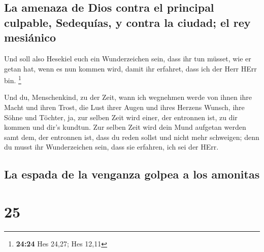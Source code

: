 \hypertarget{la-amenaza-de-dios-contra-el-principal-culpable-sedequuxedas-y-contra-la-ciudad-el-rey-mesiuxe1nico}{%
\subsection{La amenaza de Dios contra el principal culpable, Sedequías,
y contra la ciudad; el rey
mesiánico}\label{la-amenaza-de-dios-contra-el-principal-culpable-sedequuxedas-y-contra-la-ciudad-el-rey-mesiuxe1nico}}

 Und soll also Hesekiel euch ein Wunderzeichen sein, dass
ihr tun müsset, wie er getan hat, wenn es nun kommen wird, damit ihr
erfahret, dass ich der Herr HErr bin. \footnote{\textbf{24:24} Hes
  24,27; Hes 12,11}

 Und du, Menschenkind, zu der Zeit, wann ich wegnehmen
werde von ihnen ihre Macht und ihren Trost, die Lust ihrer Augen und
ihres Herzens Wunsch, ihre Söhne und Töchter,  ja, zur
selben Zeit wird einer, der entronnen ist, zu dir kommen und dir's
kundtun.  Zur selben Zeit wird dein Mund aufgetan werden
samt dem, der entronnen ist, dass du reden sollst und nicht mehr
schweigen; denn du musst ihr Wunderzeichen sein, dass sie erfahren, ich
sei der HErr.

\hypertarget{la-espada-de-la-venganza-golpea-a-los-amonitas}{%
\subsection{La espada de la venganza golpea a los
amonitas}\label{la-espada-de-la-venganza-golpea-a-los-amonitas}}

\hypertarget{section-24}{%
\section{25}\label{section-24}}

